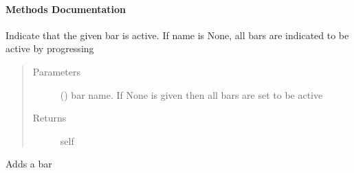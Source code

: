 \documentclass[a4paper,10pt,english]{sphinxmanual}
\begin{document}
\begin{fulllineitems}

\begin{fulllineitems}
\label{\detokenize{api/termtools.terminal.ProgressBarController:termtools.terminal.ProgressBarController.under_complete_background}}
\end{fulllineitems}


\begin{fulllineitems}
\label{\detokenize{api/termtools.terminal.ProgressBarController:termtools.terminal.ProgressBarController.under_complete_color}}
\end{fulllineitems}

\paragraph{Methods Documentation}

\begin{fulllineitems}
\label{\detokenize{api/termtools.terminal.ProgressBarController:termtools.terminal.ProgressBarController.activate}}
Indicate that the given bar is active. If name is None, all bars are indicated to be active by progressing
\begin{quote}\begin{description}
\item[{Parameters}] \leavevmode
{} () \textendash{} bar name. If None is given then all bars are set to be active

\item[{Returns}] \leavevmode
self

\end{description}\end{quote}

\end{fulllineitems}


\begin{fulllineitems}
\label{\detokenize{api/termtools.terminal.ProgressBarController:termtools.terminal.ProgressBarController.add_bar}}
Adds a bar


\end{fulllineitems}
\end{fulllineitems}
\end{document}
